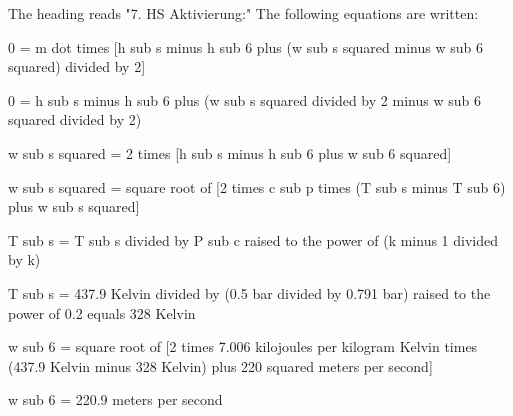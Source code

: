 The heading reads "7. HS Aktivierung:"  
The following equations are written:  

0 = m dot times [h sub s minus h sub 6 plus (w sub s squared minus w sub 6 squared) divided by 2]  

0 = h sub s minus h sub 6 plus (w sub s squared divided by 2 minus w sub 6 squared divided by 2)  

w sub s squared = 2 times [h sub s minus h sub 6 plus w sub 6 squared]  

w sub s squared = square root of [2 times c sub p times (T sub s minus T sub 6) plus w sub s squared]  

T sub s = T sub s divided by P sub c raised to the power of (k minus 1 divided by k)  

T sub s = 437.9 Kelvin divided by (0.5 bar divided by 0.791 bar) raised to the power of 0.2 equals 328 Kelvin  

w sub 6 = square root of [2 times 7.006 kilojoules per kilogram Kelvin times (437.9 Kelvin minus 328 Kelvin) plus 220 squared meters per second]  

w sub 6 = 220.9 meters per second